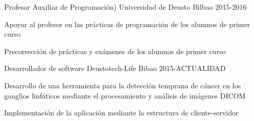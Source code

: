 


\begin{cventries}


\cventry
{Profesor Auxiliar de Programación)} %
{Universidad de Deusto} %
{Bilbao} %
{2015-2016} %
{ %
\begin{cvitems}
\item {Apoyar al profesor en las prácticas de programación de los alumnos de primer curso}
\item {Precorrección de prácticas y exámenes de los alumnos de primer curso}
\end{cvitems}
}


\cventry
{Desarrollador de software} %
{Deustotech-Life} %
{Bibao} %
{2015-ACTUALIDAD} %
{ %
\begin{cvitems}
\item {Desarrollo de una herramienta para la detección temprana de cáncer en los ganglios linfáticos mediante el procesamiento y análisis de imágenes DICOM}
\item {Implementación de la aplicación mediante la estructura de cliente-servidor}
\end{cvitems}
}
\end{cventries}
